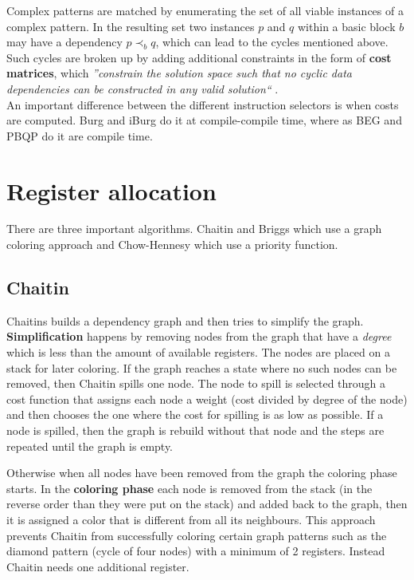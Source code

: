 \documentclass[a4paper,10pt]{article}
\begin{document}
Complex patterns are matched by enumerating the set of all viable instances of a complex pattern. In the resulting set two instances $p$ 
and $q$ within a basic block $b$ may have a dependency $p \prec_b q$, which can lead to the cycles mentioned above. Such cycles are 
broken up by adding additional constraints in the form of \textbf{cost matrices}, which \textit{''constrain the solution space such that 
no cyclic data dependencies can be constructed in any valid solution``} \cite{pbqp-instruction-selection}.\\

An important difference between the different instruction selectors is when costs are computed. Burg and iBurg do it at compile-compile 
time, where as BEG and PBQP do it are compile time.

\section{Register allocation}
\label{sec:register-allocation}
There are three important algorithms. Chaitin and Briggs which use a graph coloring approach and Chow-Hennesy which use a priority 
function.

\subsection{Chaitin}
Chaitins builds a dependency graph and then tries to simplify the graph. \textbf{Simplification} happens by removing nodes 
       from the graph that have a \textit{degree} which is less than the amount of available registers. The nodes are placed on a stack 
       for later coloring. If the graph reaches a state where no such nodes can be removed, then Chaitin spills one node. The node to 
       spill is selected through a cost function that assigns each node a weight (cost divided by degree of the node) and then chooses 
       the 
       one where the cost for spilling is as low as possible. If a node is spilled, then the graph is rebuild without that node and the 
       steps are repeated until the graph is empty. 

       Otherwise when all nodes have been removed from the graph the coloring phase starts. In the \textbf{coloring phase} each node is 
       removed from the stack (in the reverse order than they were put on the stack) and added back to the graph, then it is assigned a 
       color that is different from all its neighbours. This approach prevents Chaitin from successfully coloring certain graph patterns 
       such as the diamond pattern (cycle of four nodes) with a minimum of 2 registers. Instead Chaitin needs one additional register.
\end{document}
